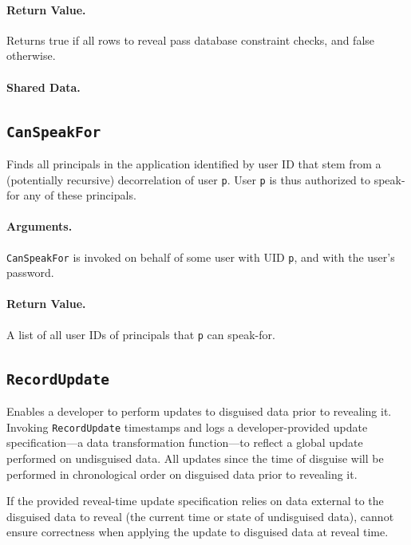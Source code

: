     \paragraph{Return Value.} 
    Returns true if all rows to reveal pass database constraint checks, and false otherwise.

    \paragraph{Shared Data.}

\subsection{\texttt{CanSpeakFor}}
    Finds all principals in the application identified by user ID that stem from
    a (potentially recursive) decorrelation of user \texttt{p}.
    User \texttt{p} is thus authorized to speak-for any of these principals.

    \paragraph{Arguments.} 
    \texttt{CanSpeakFor} is invoked on behalf of some user with UID \texttt{p},
    and with the user's password.

    \paragraph{Return Value.} 
    A list of all user IDs of principals that \texttt{p} can
    speak-for.

\subsection{\texttt{RecordUpdate}}
\label{s:semantics:updates}
Enables a developer to perform updates to disguised data prior to revealing it.
Invoking \texttt{RecordUpdate} timestamps and logs a developer-provided update
specification---a data transformation function---to reflect a global update
performed on undisguised data. All updates since the time of disguise will be
performed in chronological order on disguised data prior to revealing it.

If the provided reveal-time update specification relies on data external to the
disguised data to reveal (\eg the current time or state of undisguised data),
\sys cannot ensure correctness when applying the update to disguised data at
reveal time.

